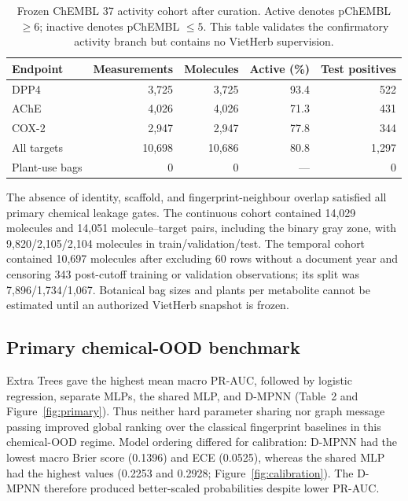 \documentclass[11pt]{article}
\begin{document}
\begin{table}[ht]
\centering
\caption{Frozen ChEMBL 37 activity cohort after curation. Active denotes
pChEMBL $\geq 6$; inactive denotes pChEMBL $\leq 5$. This table validates the
confirmatory activity branch but contains no VietHerb supervision.}
\begin{tabular}{lrrrr}
\toprule
Endpoint & Measurements & Molecules & Active (\%) & Test positives\\
\midrule
DPP4 & 3,725 & 3,725 & 93.4 & 522\\
AChE & 4,026 & 4,026 & 71.3 & 431\\
COX-2 & 2,947 & 2,947 & 77.8 & 344\\
All targets & 10,698 & 10,686 & 80.8 & 1,297\\
Plant-use bags & 0 & 0 & --- & 0\\
\bottomrule
\end{tabular}
\end{table}

The absence of identity, scaffold, and fingerprint-neighbour overlap satisfied
all primary chemical leakage gates. The continuous cohort contained 14,029
molecules and 14,051 molecule--target pairs, including the binary gray zone,
with 9,820/2,105/2,104 molecules in train/validation/test. The temporal cohort
contained 10,697 molecules after excluding 60 rows without a document year and
censoring 343 post-cutoff training or validation observations; its split was
7,896/1,734/1,067. Botanical bag sizes and plants per metabolite cannot be
estimated until an authorized VietHerb snapshot is frozen.

\subsection{Primary chemical-OOD benchmark}

Extra Trees gave the highest mean macro PR-AUC, followed by logistic regression,
separate MLPs, the shared MLP, and D-MPNN (Table~2 and
Figure~\ref{fig:primary}). Thus neither hard parameter sharing nor graph message
passing improved global ranking over the classical fingerprint baselines in
this chemical-OOD regime. Model ordering differed for calibration: D-MPNN had
the lowest macro Brier score (0.1396) and ECE (0.0525), whereas the shared MLP
had the highest values (0.2253 and 0.2928; Figure~\ref{fig:calibration}). The
D-MPNN therefore produced better-scaled probabilities despite lower PR-AUC.
\end{document}
